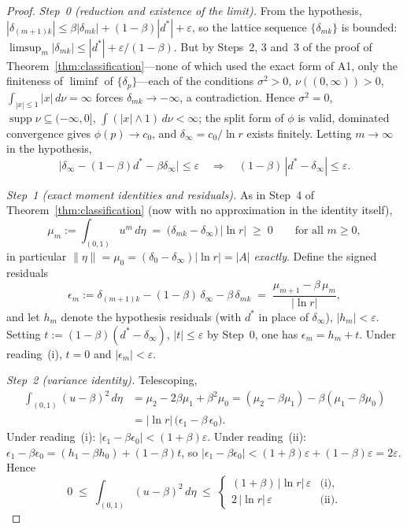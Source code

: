 \documentclass[pdflatex,sn-mathphys-num]{sn-jnl}
\theoremstyle{thmstyleone}
\theoremstyle{thmstyletwo}
\theoremstyle{thmstylethree}
\DeclareMathOperator{\supp}{supp}
\begin{document}
\begin{proof}
\textit{Step~0 (reduction and existence of the limit).}  From the
hypothesis, $|\delta_{(m+1)k}| \le \beta|\delta_{mk}| +
(1-\beta)|d^*| + \varepsilon$, so the lattice sequence
$\{\delta_{mk}\}$ is bounded:
$\limsup_m |\delta_{mk}| \le |d^*| + \varepsilon/(1-\beta)$.  But by
Steps~2, 3 and~3\textonehalf{} of the proof of
Theorem~\ref{thm:classification}---none of which used the exact
form of A1, only the finiteness of $\liminf$ of
$\{\delta_p\}$---each of the conditions $\sigma^2 > 0$,
$\nu((0,\infty)) > 0$, $\int_{|x|\le1}|x|\,d\nu = \infty$ forces
$\delta_{mk} \to -\infty$, a contradiction.  Hence $\sigma^2 = 0$,
$\supp\nu \subseteq (-\infty,0]$, $\int(|x|\wedge1)\,d\nu < \infty$;
the split form of $\phi$ is valid, dominated convergence gives
$\phi(p) \to c_0$, and $\delta_\infty = c_0/\ln r$ exists finitely.
Letting $m \to \infty$ in the hypothesis,
\[
  \bigl|\delta_\infty - (1-\beta)d^* - \beta\delta_\infty\bigr|
  \le \varepsilon
  \quad\Longrightarrow\quad
  (1-\beta)\,|d^* - \delta_\infty| \le \varepsilon .
\]

\textit{Step~1 (exact moment identities and residuals).}  As in
Step~4 of Theorem~\ref{thm:classification} (now with no
approximation in the identity itself),
\[
  \mu_m := \int_{(0,1)} u^m\,d\eta
  \;=\; \bigl(\delta_{mk} - \delta_\infty\bigr)\,|\ln r|
  \;\ge\; 0
  \qquad\text{for all } m \ge 0,
\]
in particular $\|\eta\| = \mu_0 = (\delta_0 - \delta_\infty)|\ln r| =
|A|$ \emph{exactly}.  Define the signed residuals
\[
  \epsilon_m := \delta_{(m+1)k} - (1-\beta)\,\delta_\infty
  - \beta\,\delta_{mk}
  \;=\; \frac{\mu_{m+1} - \beta\,\mu_m}{|\ln r|},
\]
and let $h_m$ denote the hypothesis residuals (with $d^*$ in place
of $\delta_\infty$), $|h_m| < \varepsilon$.  Setting
$t := (1-\beta)(d^* - \delta_\infty)$, $|t| \le \varepsilon$ by
Step~0, one has $\epsilon_m = h_m + t$.  Under reading~(i), $t = 0$
and $|\epsilon_m| < \varepsilon$.

\textit{Step~2 (variance identity).}  Telescoping,
\[
\begin{aligned}
  \int_{(0,1)} (u-\beta)^2\,d\eta
  &= \mu_2 - 2\beta\mu_1 + \beta^2\mu_0
  = (\mu_2 - \beta\mu_1) - \beta(\mu_1 - \beta\mu_0)\\
  &= |\ln r|\,\bigl(\epsilon_1 - \beta\,\epsilon_0\bigr).
\end{aligned}
\]
Under reading~(i): $|\epsilon_1 - \beta\epsilon_0| < (1+\beta)
\varepsilon$.  Under reading~(ii):
$\epsilon_1 - \beta\epsilon_0 = (h_1 - \beta h_0) + (1-\beta)t$, so
$|\epsilon_1 - \beta\epsilon_0| < (1+\beta)\varepsilon +
(1-\beta)\varepsilon = 2\varepsilon$.  Hence
\[
  0 \;\le\; \int_{(0,1)}(u-\beta)^2\,d\eta
  \;\le\;
  \begin{cases}
    (1+\beta)\,|\ln r|\,\varepsilon & \text{(i)},\\[2pt]
    2\,|\ln r|\,\varepsilon & \text{(ii)}.
  \end{cases}
\]


\end{proof}
\end{document}
